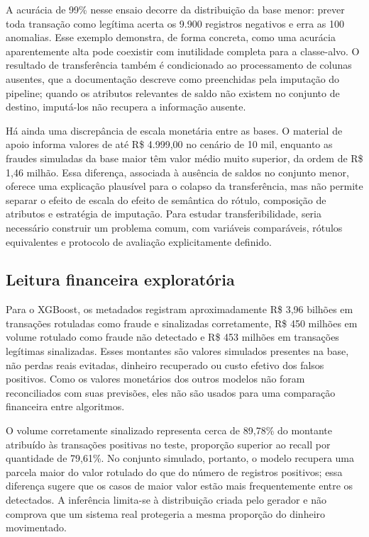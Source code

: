 \documentclass[11pt,a4paper]{article}
\begin{document}
A acurácia de 99\% nesse ensaio decorre da distribuição da base menor: prever toda transação como legítima acerta os 9.900 registros negativos e erra as 100 anomalias. Esse exemplo demonstra, de forma concreta, como uma acurácia aparentemente alta pode coexistir com inutilidade completa para a classe-alvo. O resultado de transferência também é condicionado ao processamento de colunas ausentes, que a documentação descreve como preenchidas pela imputação do pipeline; quando os atributos relevantes de saldo não existem no conjunto de destino, imputá-los não recupera a informação ausente.

Há ainda uma discrepância de escala monetária entre as bases. O material de apoio informa valores de até R\$ 4.999,00 no cenário de 10 mil, enquanto as fraudes simuladas da base maior têm valor médio muito superior, da ordem de R\$ 1,46 milhão. Essa diferença, associada à ausência de saldos no conjunto menor, oferece uma explicação plausível para o colapso da transferência, mas não permite separar o efeito de escala do efeito de semântica do rótulo, composição de atributos e estratégia de imputação. Para estudar transferibilidade, seria necessário construir um problema comum, com variáveis comparáveis, rótulos equivalentes e protocolo de avaliação explicitamente definido.

\subsection{Leitura financeira exploratória}

Para o XGBoost, os metadados registram aproximadamente R\$ 3,96 bilhões em transações rotuladas como fraude e sinalizadas corretamente, R\$ 450 milhões em volume rotulado como fraude não detectado e R\$ 453 milhões em transações legítimas sinalizadas. Esses montantes são valores simulados presentes na base, não perdas reais evitadas, dinheiro recuperado ou custo efetivo dos falsos positivos. Como os valores monetários dos outros modelos não foram reconciliados com suas previsões, eles não são usados para uma comparação financeira entre algoritmos.

O volume corretamente sinalizado representa cerca de 89,78\% do montante atribuído às transações positivas no teste, proporção superior ao recall por quantidade de 79,61\%. No conjunto simulado, portanto, o modelo recupera uma parcela maior do valor rotulado do que do número de registros positivos; essa diferença sugere que os casos de maior valor estão mais frequentemente entre os detectados. A inferência limita-se à distribuição criada pelo gerador e não comprova que um sistema real protegeria a mesma proporção do dinheiro movimentado.
\end{document}
